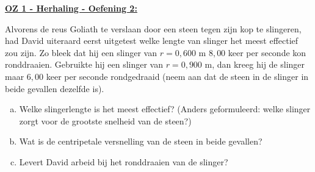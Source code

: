 \textbf{\underline{OZ 1 - Herhaling - Oefening 2:}}
\vspace{0.5cm}

Alvorens de reus Goliath te verslaan door een steen tegen zijn kop te slingeren,
had David uiteraard eerst uitgetest welke lengte van slinger het meest effectief zou zijn. Zo bleek
dat hij een slinger van $r = 0,600$ m $8,00$ keer per seconde kon ronddraaien. Gebruikte hij een
slinger van $r = 0,900$ m, dan kreeg hij de slinger maar $6,00$ keer per seconde rondgedraaid (neem
aan dat de steen in de slinger in beide gevallen dezelfde is).

\begin{enumerate}[(a)]
    \item Welke slingerlengte is het meest effectief? (Anders geformuleerd: welke slinger zorgt voor de grootste snelheid van de steen?)
    \item Wat is de centripetale versnelling van de steen in beide gevallen?
    \item Levert David arbeid bij het ronddraaien van de slinger?
\end{enumerate}

